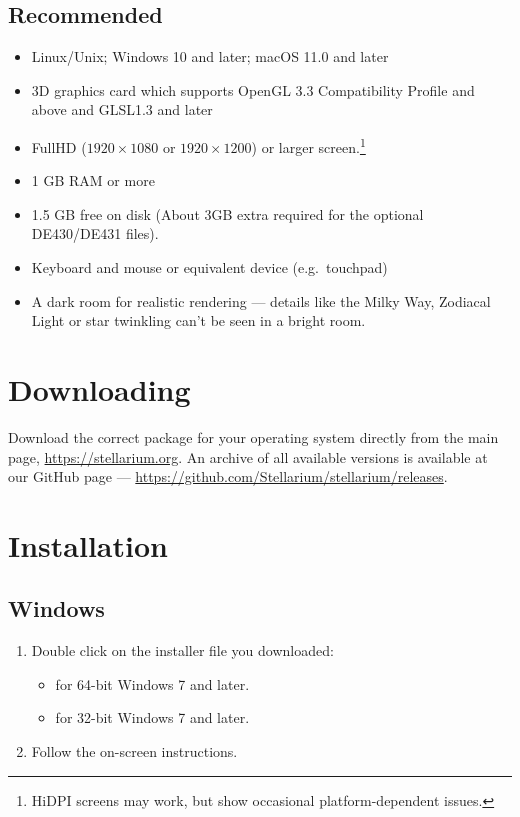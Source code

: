 \subsection{Recommended}
\begin{itemize}
\item Linux/Unix; Windows 10 and later; macOS 11.0 and later
\item 3D graphics card which supports OpenGL 3.3 Compatibility Profile and above and GLSL1.3 and later
\item FullHD ($1920\times1080$ or $1920\times1200$) or larger screen.\footnote{HiDPI screens may work, but show occasional platform-dependent issues.}
\item 1 GB RAM or more
\item 1.5 GB free on disk (About 3GB extra required for the optional DE430/DE431 files).
\item Keyboard and mouse or equivalent device (e.g.\ touchpad)
\item A dark room for realistic rendering --- details like the Milky Way, Zodiacal Light 
      or star twinkling can't be seen in a bright room.
\end{itemize}


\section{Downloading}
\label{sec:GettingStarted:Downloading}

Download the correct package for your operating system directly from the main page, \newline \url{https://stellarium.org}.
An archive of all available versions is available at our GitHub page --- \url{https://github.com/Stellarium/stellarium/releases}.

\section{Installation}
\label{sec:GettingStarted:Installation}

\subsection{Windows}
\label{sec:GettingStarted:Installation:Windows}

\begin{enumerate}
\item Double click on the installer file you downloaded:
\begin{itemize}
\item {} for 64-bit Windows 7 and later.
\item {} for 32-bit Windows 7 and later.
\end{itemize}
\item Follow the on-screen instructions.
\end{enumerate}

